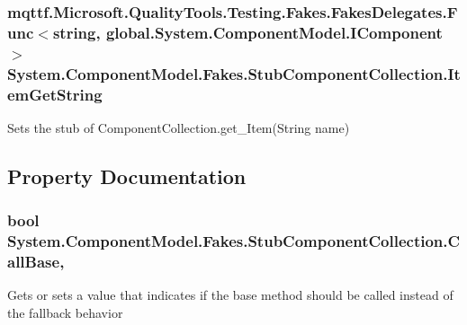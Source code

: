 \hypertarget{class_system_1_1_component_model_1_1_fakes_1_1_stub_component_collection_a2b176a5c182bb91d345151ece567939a}{
\subsubsection[{Item\-Get\-String}]{\setlength{\rightskip}{0pt plus 5cm}mqttf.\-Microsoft.\-Quality\-Tools.\-Testing.\-Fakes.\-Fakes\-Delegates.\-Func$<$string, global.\-System.\-Component\-Model.\-I\-Component$>$ System.\-Component\-Model.\-Fakes.\-Stub\-Component\-Collection.\-Item\-Get\-String}}\label{class_system_1_1_component_model_1_1_fakes_1_1_stub_component_collection_a2b176a5c182bb91d345151ece567939a}


Sets the stub of Component\-Collection.\-get\-\_\-\-Item(\-String name)



\subsection{Property Documentation}
\hypertarget{class_system_1_1_component_model_1_1_fakes_1_1_stub_component_collection_a9a907a78a1a84b2bf7d60957e243e7f0}{
\subsubsection[{Call\-Base}]{\setlength{\rightskip}{0pt plus 5cm}bool System.\-Component\-Model.\-Fakes.\-Stub\-Component\-Collection.\-Call\-Base\hspace{0.3cm}{\ttfamily [get]}, {\ttfamily [set]}}}\label{class_system_1_1_component_model_1_1_fakes_1_1_stub_component_collection_a9a907a78a1a84b2bf7d60957e243e7f0}


Gets or sets a value that indicates if the base method should be called instead of the fallback behavior

